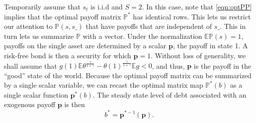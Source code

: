 \documentclass[12pt]{article}
\newcommand{\EE}{\mathbb E}
\begin{document}
Temporarily assume that $s_t$ is i.i.d and  $S=2$.  In this case, note that \eqref{eqn:optPP} implies that the optimal payoff matrix $\mathbb{P}^*$ has identical rows. This lets us restrict our attention to $\mathbb{P}(s,s\_)$ that have payoffs that are independent of $s\_$. This
 in turn lets us summarize  $\mathbb{P}$ with  a vector.
 Under the normalization  $\mathbb{E}\mathbb{P}(s)=1$, payoffs on the single asset are  determined by a  scalar $\bm{p}$, the payoff in state 1.   A risk-free bond is then a security for which $\bm{p} = 1$.  Without loss of generality, we shall assume that $ g(1)\EE\theta^\frac{\gamma}{1+\gamma}-\theta(1)^\frac\gamma{1+\gamma} \mathbb{E}g <0$, and thus, $\bm p$ is the payoff in the ``good'' state of the world.  Because the optimal payoff matrix can be summarized by a single scalar variable, we can recast the optimal matrix map $\mathbb P^*(b)$ as a single scalar function $\bm p^*(b)$.  The steady state level of debt associated with an exogenous  payoff $\bm p$ is then
\begin{equation}
\label{eq-ss}
 b^* =  {\bm p}^{* -1}(\bm{p}).
\end{equation}
\end{document}
